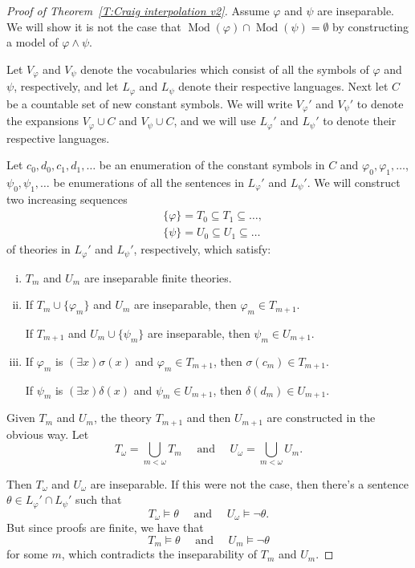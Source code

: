 \documentclass{scrartcl}
\DeclareMathOperator{\Mod}{Mod}
\renewcommand{\phi}{\varphi}
\begin{document}
\begin{proof}[Proof of Theorem~\ref{T:Craig interpolation v2}]
Assume $\phi$ and $\psi$ are inseparable. We will show it is not the case that $\Mod(\phi)\cap\Mod(\psi)=\emptyset$ by constructing a model of $\phi\wedge \psi$.

Let $V_\phi$ and $V_\psi$ denote the vocabularies which consist of all the symbols of $\phi$ and $\psi$, respectively, and let $L_\phi$ and $L_\psi$ denote their respective languages. Next let $C$ be a countable set of new constant symbols. We will write $V_\phi '$ and $V_\psi '$ to denote the expansions $V_\phi\cup C$ and $V_\psi\cup C$, and we will use $L_\phi '$ and $L_\psi '$ to denote their respective languages.

Let $c_0,d_0,c_1,d_1,\dots$ be an enumeration of the constant symbols in $C$ and $\phi_0,\phi_1,\dots$, $\psi_0,\psi_1,\dots$ be enumerations of all the sentences in $L_\phi '$ and $L_\psi '$. We will construct two increasing sequences
\begin{align*}
&\{\phi\}=T_0\subseteq T_1\subseteq\dots,\\
&\{\psi\}=U_0\subseteq U_1\subseteq\dots
\end{align*}
of theories in $L_\phi '$ and $L_\psi '$, respectively, which satisfy:
\begin{enumerate}[i)]
\item $T_m$ and $U_m$ are inseparable finite theories.

\item If $T_m\cup \{\phi_m\}$ and $U_m$ are inseparable, then $\phi_m\in T_{m+1}$.

If $T_{m+1}$ and $U_m\cup\{\psi_m\}$ are inseparable, then $\psi_m\in U_{m+1}$.

\item If $\phi_m$ is $(\exists x)\sigma(x)$ and $\phi_m\in T_{m+1}$, then $\sigma(c_m)\in T_{m+1}$.

If $\psi_m$ is $(\exists x)\delta(x)$ and $\psi_m\in U_{m+1}$, then $\delta(d_m)\in U_{m+1}$.
\end{enumerate}
Given $T_m$ and $U_m$, the theory $T_{m+1}$ and then $U_{m+1}$ are constructed in the obvious way. Let \[
T_\omega = \bigcup_{m<\omega}T_m \quad\text{ and }\quad U_\omega = \bigcup_{m<\omega}U_m.
\]

Then $T_\omega$ and $U_\omega$ are inseparable. If this were not the case, then there's a sentence $\theta\in L_\phi'\cap L_\psi'$ such that
\[
T_\omega\models \theta \quad \text{ and }\quad U_\omega\models \neg\theta.
\]
But since proofs are finite, we have that
\[
T_m\models \theta \quad \text{ and }\quad U_m\models \neg\theta
\]
for some $m$, which contradicts the inseparability of $T_m$ and $U_m$.


\end{proof}
\end{document}

